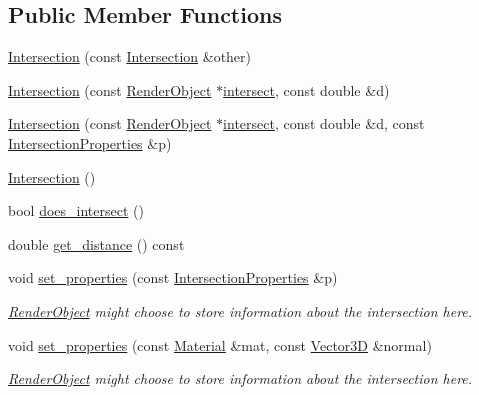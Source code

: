 \subsection*{Public Member Functions}
\begin{DoxyCompactItemize}
\item 
\mbox{\hyperlink{classIntersection_a6d6042fc104b258908c3c55d7cc23aa3}{Intersection}} (const \mbox{\hyperlink{classIntersection}{Intersection}} \&other)
\item 
\mbox{\hyperlink{classIntersection_accfff54844dea1b64fce8ddb1c72f84d}{Intersection}} (const \mbox{\hyperlink{classRenderObject}{Render\+Object}} $\ast$\mbox{\hyperlink{classIntersection_a8241676dd0f240769dc189132dc3c5bb}{intersect}}, const double \&d)
\item 
\mbox{\hyperlink{classIntersection_a8c9336839207202dbd7cc8eef633272e}{Intersection}} (const \mbox{\hyperlink{classRenderObject}{Render\+Object}} $\ast$\mbox{\hyperlink{classIntersection_a8241676dd0f240769dc189132dc3c5bb}{intersect}}, const double \&d, const \mbox{\hyperlink{classIntersectionProperties}{Intersection\+Properties}} \&p)
\item 
\mbox{\hyperlink{classIntersection_a67497e3efe2793b23909052eeb82c4f3}{Intersection}} ()
\item 
bool \mbox{\hyperlink{classIntersection_ae2d6edc03a6a048258724c2ca7ca2dc8}{does\+\_\+intersect}} ()
\item 
double \mbox{\hyperlink{classIntersection_ad39ef218f5afc1fde63dba0a102806f8}{get\+\_\+distance}} () const
\item 
void \mbox{\hyperlink{classIntersection_afeb53190b4cae138c2ab89b8b7198481}{set\+\_\+properties}} (const \mbox{\hyperlink{classIntersectionProperties}{Intersection\+Properties}} \&p)
\begin{DoxyCompactList}\small\item\em \mbox{\hyperlink{classRenderObject}{Render\+Object}} might choose to store information about the intersection here. \end{DoxyCompactList}\item 
void \mbox{\hyperlink{classIntersection_aa5b98f38c76a5b3fb869b89ddc77f2da}{set\+\_\+properties}} (const \mbox{\hyperlink{classMaterial}{Material}} \&mat, const \mbox{\hyperlink{classVector3D}{Vector3D}} \&normal)
\begin{DoxyCompactList}\small\item\em \mbox{\hyperlink{classRenderObject}{Render\+Object}} might choose to store information about the intersection here. \end{DoxyCompactList}\item 

\end{DoxyCompactItemize}
